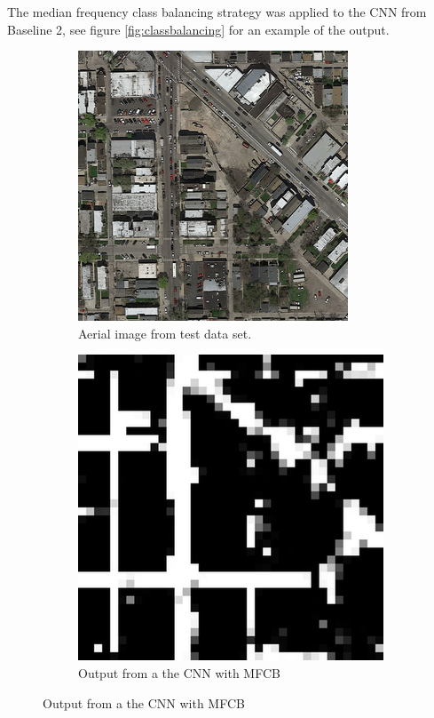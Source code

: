 \documentclass[10pt,conference,compsocconf]{IEEEtran}
\begin{document}
The median frequency class balancing strategy was applied to the CNN from Baseline 2, see figure \ref{fig:classbalancing} for an example of the output.

\begin{figure}[h!]

\begin{subfigure}{0.2\textwidth}
\includegraphics[width=\linewidth]{test_11.png}
\caption{Aerial image from test data set.}
\label{fig:test}
\end{subfigure}
\hspace*{\fill}
\begin{subfigure}{0.2\textwidth}
\includegraphics[width=\linewidth]{raw_test_11_pixels.png}
\caption{Output from a the CNN with MFCB}
\label{fig:MFCB}
\end{subfigure}


\end{figure}
\end{document}
